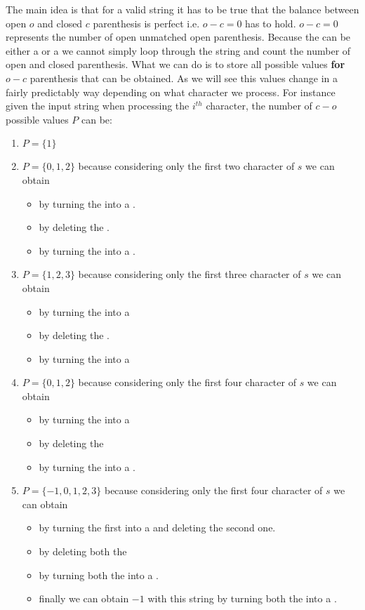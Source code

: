 The main idea  is that for a valid string it has to be true that the balance between open $o$ and closed $c$ parenthesis is perfect i.e. $o-c=0$ has to hold. $o-c=0$ represents the number of open unmatched open parenthesis. Because the \fbox{*} can be either a \fbox{(} or a \fbox{)} we cannot simply loop through the string and count the number of open and closed parenthesis. What we can do is to store all possible values \textbf{for} $o-c$ parenthesis that can be obtained. As we will see this values change in a fairly predictably way depending on what character we process.
For instance given the input string  when processing the $i^{th}$ character, the number of $c-o$ possible values $P$ can be:
\begin{enumerate}
	\item $P=\{1\}$ 
	\item $P=\{0,1,2\}$ because considering only the first two character of $s$ \fbox{(*} we can obtain 
	\begin{itemize}
		\item  \fbox{((} by turning the \fbox{*} into a \fbox{(}.
		\item \fbox{(} by deleting the \fbox{*}.
		\item \fbox{()} by turning the \fbox{*} into a \fbox{)}.
	\end{itemize}
	\item $P=\{1,2,3\}$ because considering only the first three character of $s$ \fbox{(*(} we can obtain
	\begin{itemize}
		\item \fbox{(((} by turning the \fbox{*} into a \fbox{(}
		\item \fbox{(\aspace(} by deleting the \fbox{*}.
		\item \fbox{(((} by turning the \fbox{*} into a \fbox{(}
	\end{itemize}
	\item $P=\{0,1,2\}$ because considering only the first four character of $s$ \fbox{(*()} we can obtain 
	\begin{itemize}
		\item \fbox{()()} by turning the \fbox{*} into a \fbox{)}
		\item \fbox{(\aspace()} by deleting the \fbox{*}
		\item \fbox{((()} by turning the \fbox{*} into a \fbox{(}.
	\end{itemize}
	\item $P=\{-1,0,1,2,3\}$ because considering only the first four character of $s$ \fbox{(*()*} we can obtain 
	\begin{itemize}
		\item \fbox{()()\aspace} by turning the first \fbox{*} into a \fbox{)} and deleting the second one.
		\item \fbox{(\aspace()\aspace} by deleting both the \fbox{*}
		\item \fbox{((()(} by turning both the \fbox{*} into a \fbox{(}.
		\item finally we can obtain $-1$ with this string \fbox{((()(} by turning both the \fbox{*} into a \fbox{)}.
	\end{itemize}
\end{enumerate}

